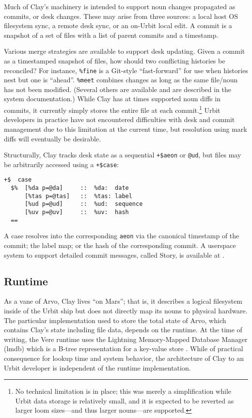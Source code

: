 \documentclass[twoside]{article}
\begin{document}
\sloppy
Much of Clay's machinery is intended to support noun changes propagated as commits, or desk changes.  These may arise from three sources:  a local host OS filesystem sync, a remote desk sync, or an on-Urbit local edit.  A commit is a snapshot of a set of files with a list of parent commits and a timestamp.

Various merge strategies are available to support desk updating.  Given a commit as a timestamped snapshot of files, how should two conflicting histories be reconciled?  For instance, \lstinline[style=inlinecode]{%fine} is a Git-style ``fast-forward'' for use when histories nest but one is ``ahead''.  \lstinline[style=inlinecode]{%meet} combines changes as long as the same file/noun has not been modified.  (Several others are available and are described in the system documentation.)  While Clay has at times supported noun diffs in commits, it currently simply stores the entire file at each commit.\footnote{No technical limitation is in place; this was merely a simplification while Urbit data storage is relatively small, and it is expected to be reverted as larger loom sizes—and thus larger nouns—are supported.}  Urbit developers in practice have not encountered difficulties with desk and commit management due to this limitation at the current time, but resolution using mark diffs will eventually be desirable.

Structurally, Clay tracks desk state as a sequential \lstinline[style=inlinecode]{+$aeon} or \lstinline[style=inlinecode]{@ud}, but files may be arbitrarily accessed using a \lstinline[style=inlinecode]{+$case}:

\begin{lstlisting}[style=listingcode]
+$  case
  $%  [%da p=@da]     ::  %da:  date
      [%tas p=@tas]   ::  %tas: label
      [%ud p=@ud]     ::  %ud:  sequence
      [%uv p=@uv]     ::  %uv:  hash
  ==
\end{lstlisting}

\noindent
A case resolves into the corresponding \lstinline[style=inlinecode]{aeon} via the canonical timestamp of the commit; the label map; or the hash of the corresponding commit.  A userspace system to support detailed commit messages, called Story, is available at .

\subsection{Runtime}

As a vane of Arvo, Clay lives ``on Mars''; that is, it describes a logical filesystem inside of the Urbit ship but does not directly map its nouns to physical hardware.  The particular implementation used to store the total state of Arvo, which contains Clay's state including file data, depends on the runtime.  At the time of writing, the Vere runtime uses the Lightning Memory-Mapped Database Manager ({\sc lmdb}) which is a B-tree representation for a key-value store \citep{LMDB}.  While of practical consequence for lookup time and system behavior, the architecture of Clay to an Urbit developer is independent of the runtime implementation.
\end{document}
